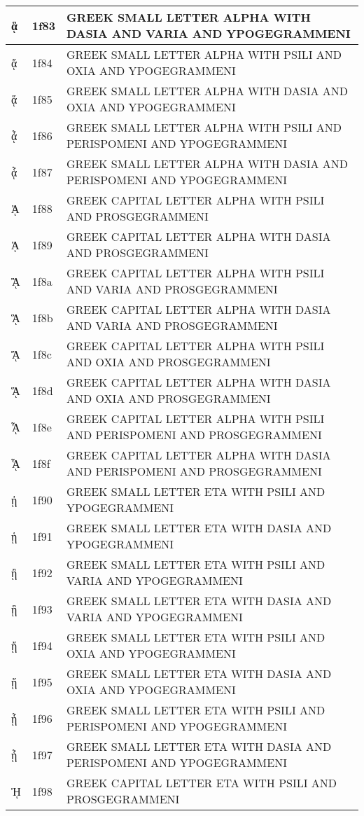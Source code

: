 \documentclass[12pt,letterpaper,openany]{book}
\begin{document}
\begin{center}
\begin{supertabular}{|m{0.25in}|m{0.5in}|m{4in}|}
ᾃ & 1f83 & GREEK SMALL LETTER ALPHA WITH DASIA AND VARIA AND YPOGEGRAMMENI\\\hline
ᾄ & 1f84 & GREEK SMALL LETTER ALPHA WITH PSILI AND OXIA AND YPOGEGRAMMENI\\\hline
ᾅ & 1f85 & GREEK SMALL LETTER ALPHA WITH DASIA AND OXIA AND YPOGEGRAMMENI\\\hline
ᾆ & 1f86 & GREEK SMALL LETTER ALPHA WITH PSILI AND PERISPOMENI AND YPOGEGRAMMENI\\\hline
ᾇ & 1f87 & GREEK SMALL LETTER ALPHA WITH DASIA AND PERISPOMENI AND YPOGEGRAMMENI\\\hline
ᾈ & 1f88 & GREEK CAPITAL LETTER ALPHA WITH PSILI AND PROSGEGRAMMENI\\\hline
ᾉ & 1f89 & GREEK CAPITAL LETTER ALPHA WITH DASIA AND PROSGEGRAMMENI\\\hline
ᾊ & 1f8a & GREEK CAPITAL LETTER ALPHA WITH PSILI AND VARIA AND PROSGEGRAMMENI\\\hline
ᾋ & 1f8b & GREEK CAPITAL LETTER ALPHA WITH DASIA AND VARIA AND PROSGEGRAMMENI\\\hline
ᾌ & 1f8c & GREEK CAPITAL LETTER ALPHA WITH PSILI AND OXIA AND PROSGEGRAMMENI\\\hline
ᾍ & 1f8d & GREEK CAPITAL LETTER ALPHA WITH DASIA AND OXIA AND PROSGEGRAMMENI\\\hline
ᾎ & 1f8e & GREEK CAPITAL LETTER ALPHA WITH PSILI AND PERISPOMENI AND PROSGEGRAMMENI\\\hline
ᾏ & 1f8f & GREEK CAPITAL LETTER ALPHA WITH DASIA AND PERISPOMENI AND PROSGEGRAMMENI\\\hline
ᾐ & 1f90 & GREEK SMALL LETTER ETA WITH PSILI AND YPOGEGRAMMENI\\\hline
ᾑ & 1f91 & GREEK SMALL LETTER ETA WITH DASIA AND YPOGEGRAMMENI\\\hline
ᾒ & 1f92 & GREEK SMALL LETTER ETA WITH PSILI AND VARIA AND YPOGEGRAMMENI\\\hline
ᾓ & 1f93 & GREEK SMALL LETTER ETA WITH DASIA AND VARIA AND YPOGEGRAMMENI\\\hline
ᾔ & 1f94 & GREEK SMALL LETTER ETA WITH PSILI AND OXIA AND YPOGEGRAMMENI\\\hline
ᾕ & 1f95 & GREEK SMALL LETTER ETA WITH DASIA AND OXIA AND YPOGEGRAMMENI\\\hline
ᾖ & 1f96 & GREEK SMALL LETTER ETA WITH PSILI AND PERISPOMENI AND YPOGEGRAMMENI\\\hline
ᾗ & 1f97 & GREEK SMALL LETTER ETA WITH DASIA AND PERISPOMENI AND YPOGEGRAMMENI\\\hline
ᾘ & 1f98 & GREEK CAPITAL LETTER ETA WITH PSILI AND PROSGEGRAMMENI\\\hline

\end{supertabular}
\end{center}
\end{document}
